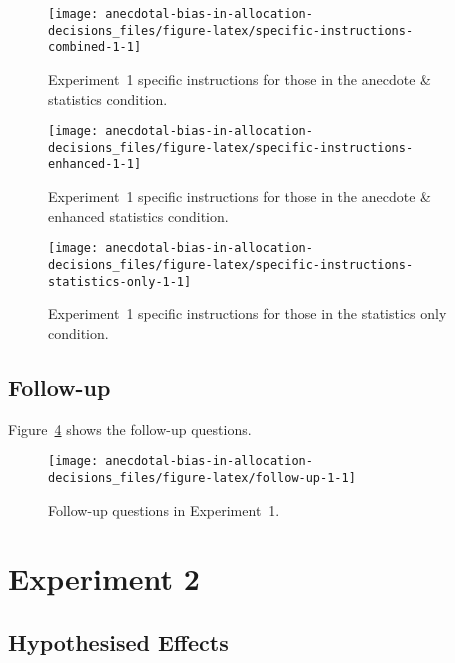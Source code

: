\documentclass[
  man, donotrepeattitle,floatsintext]{apa7}
\theoremstyle{definition}
\theoremstyle{definition}
\theoremstyle{definition}
\theoremstyle{definition}
\theoremstyle{remark}
\begin{document}
\begin{figure}
\texttt{[image: anecdotal-bias-in-allocation-decisions\_files/figure-latex/specific-instructions-combined-1-1]} \caption{Experiment~1 specific instructions for those in the anecdote \& statistics condition.}\label{fig:specific-instructions-combined-1}
\end{figure}



\begin{figure}
\texttt{[image: anecdotal-bias-in-allocation-decisions\_files/figure-latex/specific-instructions-enhanced-1-1]} \caption{Experiment~1 specific instructions for those in the anecdote \& enhanced statistics condition.}\label{fig:specific-instructions-enhanced-1}
\end{figure}



\begin{figure}
\texttt{[image: anecdotal-bias-in-allocation-decisions\_files/figure-latex/specific-instructions-statistics-only-1-1]} \caption{Experiment~1 specific instructions for those in the statistics only condition.}\label{fig:specific-instructions-statistics-only-1}
\end{figure}

\hypertarget{follow-up-materials-1}{%
\subsection{Follow-up}\label{follow-up-materials-1}}

Figure~\ref{fig:follow-up-1} shows the follow-up questions.



\begin{figure}
\texttt{[image: anecdotal-bias-in-allocation-decisions\_files/figure-latex/follow-up-1-1]} \caption{Follow-up questions in Experiment~1.}\label{fig:follow-up-1}
\end{figure}

\hypertarget{experiment-2}{%
\section{Experiment 2}\label{experiment-2}}

\hypertarget{hypothesised-effects-anecdotes-2}{%
\subsection{Hypothesised Effects}\label{hypothesised-effects-anecdotes-2}}
\end{document}
